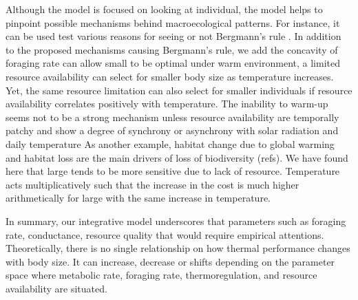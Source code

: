 Although the model is focused on looking at individual, the model helps to pinpoint possible mechanisms behind macroecological patterns.
For instance, it can be used test various reasons for seeing or not Bergmann's rule \citep{Blackburn1999}.
In addition to the proposed mechanisms causing Bergmann's rule, we add the concavity of foraging rate can allow small to be optimal under warm environment, a limited resource availability can select for smaller body size as temperature increases. 
Yet, the same resource limitation can also select for smaller individuals if resource availability correlates positively with temperature.
The inability to warm-up seems not to be a strong mechanism unless resource availability are temporally patchy and show a degree of synchrony or asynchrony with solar radiation and daily temperature 
As another example, habitat change due to global warming and habitat loss are the main drivers of loss of biodiversity (refs).
We have found here that large tends to be more sensitive due to lack of resource.
Temperature acts multiplicatively such that the increase in the cost is much higher arithmetically for large with the same increase in temperature.

In summary, our integrative model underscores that parameters such as foraging rate, conductance, resource quality that would require empirical attentions.
Theoretically, there is no single relationship on how thermal performance changes with body size.
It can increase, decrease or shifts depending on the parameter space where metabolic rate, foraging rate, thermoregulation, and resource availability are situated.




